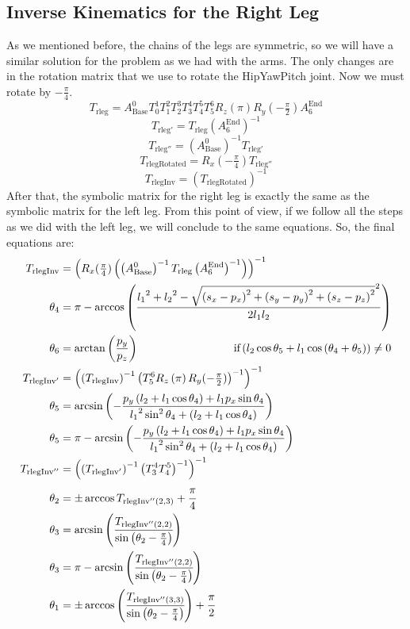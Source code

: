 \subsection{Inverse Kinematics for the Right Leg}
As we mentioned before, the chains of the legs are symmetric, so we will have a similar solution for the problem as we had with the arms. The only changes are in the rotation matrix that we use to rotate the HipYawPitch joint. Now we must rotate by $-\frac{\pi}{4}$.
\[
T_{\text{rleg}} = A^0_\text{Base}T^1_0T^2_1T^3_2T^4_3T^5_4T^6_5R_z(\pi)R_y(-\tfrac{\pi}{2})A^\text{End}_6
\]
\[
T_{\text{rleg}'} = T_\text{rleg}{\left(A^\text{End}_6\right)}^{-1}
\]
\[
T_{\text{rleg}''} = {\left(A^0_\text{Base}\right)}^{-1}T_{\text{rleg}'}
\]
\[
T_\text{rlegRotated} = R_x(-\tfrac{\pi}{4}) T_{\text{rleg}''}
\]
\[
T_\text{rlegInv} = {\left(T_\text{rlegRotated}\right)}^{-1}
\]
After that, the symbolic matrix for the right leg is exactly the same as the symbolic matrix for the left leg. From this point of view, if we follow all the steps as we did with the left leg, we will conclude to the same equations. So, the final equations are:
\begin{align*}
T_\text{rlegInv} &= \left(R_x(\tfrac{\pi}{4})\left(\left(A^0_\text{Base}\right)^{-1} T_\text{rleg} \left(A^\text{End}_6\right)^{-1}\right)\right)^{-1} \\
\theta_4 &=\pi - \arccos\left(\frac{{l_1}^2 + {l_2}^2 - \sqrt{\left(s_x-p_x\right)^2 + \left(s_y-p_y\right)^2 + \left(s_z-p_z\right)^2}^2}{2 l_1 l_2}\right) \\
\theta_6 &= \arctan\left(\frac{p_y}{p_z}\right)\hspace{3cm}\text{if} \left(l_2\cos\theta_5 + l_1 \cos\left(\theta_4 + \theta_5\right)\right) \neq 0 \\
T_{\text{rlegInv}'} &= \left(\left(T_\text{rlegInv}\right)^{-1}\left(T^6_5R_z\left(\pi\right)R_y(-\tfrac{\pi}{2})\right)^{-1}\right)^{-1} \\
\theta_5 &= \arcsin\left(-\frac{p_y\left(l_2+l_1\cos\theta_4\right) + l_1p_x\sin\theta_4}{{l_1}^2\sin^2\theta_4 + \left(l_2 + l_1\cos\theta_4\right)}\right) \\
\theta_5 &= \pi - \arcsin\left(-\frac{p_y\left(l_2+l_1\cos\theta_4\right) + l_1p_x\sin\theta_4}{{l_1}^2\sin^2\theta_4 + \left(l_2 + l_1\cos\theta_4\right)}\right)\\
T_{\text{rlegInv}''} &= \left(\left(T_{\text{rlegInv}'}\right)^{-1}\left(T^4_3T^5_4\right)^{-1}\right)^{-1} \\
\theta_2 &= \pm\arccos T_{\text{rlegInv}''(2,3)} + \cfrac{\pi}{4} \\
\theta_3 &= \arcsin\left(\cfrac{T_{\text{rlegInv}''(2,2)}}{\sin\left(\theta_2 - \frac{\pi}{4}\right)}\right) \\
\theta_3 &= \pi - \arcsin\left(\cfrac{T_{\text{rlegInv}''(2,2)}}{\sin\left(\theta_2 - \frac{\pi}{4}\right)}\right) \\
\theta_1 &= \pm\arccos\left(\cfrac{T_{\text{rlegInv}''(3,3)}}{\sin\left(\theta_2 - \frac{\pi}{4}\right)}\right) + \cfrac{\pi}{2}
\end{align*}

